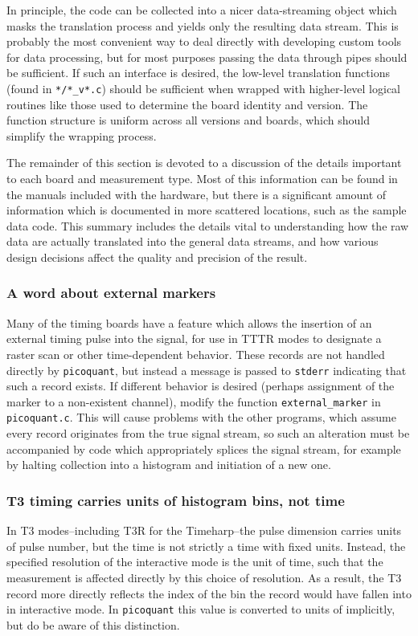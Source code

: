 \documentclass{article}
\newcommand{\stderr}{\texttt{stderr}}
\newcommand{\picoquant}{\texttt{picoquant}}
\begin{document}
In principle, the code can be collected into a nicer data-streaming object which masks the translation process and yields only the resulting data stream. This is probably the most convenient way to deal directly with developing custom tools for data processing, but for most purposes passing the data through pipes should be sufficient. If such an interface is desired, the low-level translation functions (found in \texttt{*/*\_v*.c}) should be sufficient when wrapped with higher-level logical routines like those used to determine the board identity and version. The function structure is uniform across all versions and boards, which should simplify the wrapping process.

The remainder of this section is devoted to a discussion of the details important to each board and measurement type. Most of this information can be found in the manuals included with the hardware, but there is a significant amount of information which is documented in more scattered locations, such as the sample data code. This summary includes the details vital to understanding how the raw data are actually translated into the general data streams, and how various design decisions affect the quality and precision of the result.

\subsubsection{A word about external markers}
Many of the timing boards have a feature which allows the insertion of an external timing pulse into the signal, for use in TTTR modes to designate a raster scan or other time-dependent behavior. These records are not handled directly by \picoquant, but instead a message is passed to \stderr{} indicating that such a record exists. If different behavior is desired (perhaps assignment of the marker to a non-existent channel), modify the function \texttt{external\_marker} in \texttt{picoquant.c}. This will cause problems with the other programs, which assume every record originates from the true signal stream, so such an alteration must be accompanied by code which appropriately splices the signal stream, for example by halting collection into a histogram and initiation of a new one.

\subsubsection{T3 timing carries units of histogram bins, not time}
In T3 modes--including T3R for the Timeharp--the pulse dimension carries units of pulse number, but the time is not strictly a time with fixed units. Instead, the specified resolution of the interactive mode is the unit of time, such that the measurement is affected directly by this choice of resolution. As a result, the T3 record more directly reflects the index of the bin the record would have fallen into in interactive mode. In \picoquant{} this value is converted to units of \pico\second{} implicitly, but do be aware of this distinction.
\end{document}
